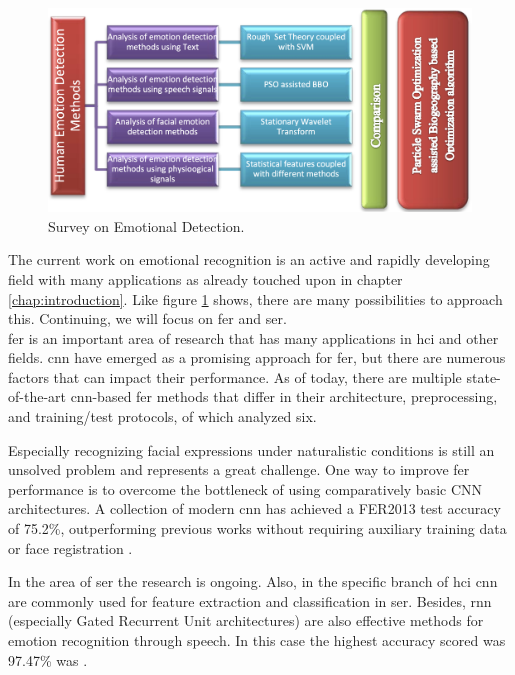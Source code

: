 \begin{figure}[h]
\centering
\includegraphics[width=1\textwidth]{images/Emotion-detection-survey.png}
\caption{Survey on Emotional Detection. \cite{survey}}\label{fig:survey}
\end{figure}

\noindent The current work on emotional recognition is an active and rapidly developing field with many applications as already touched upon in chapter \ref{chap:introduction}. Like figure \ref{fig:survey} shows, there are many possibilities to approach this. Continuing, we will focus on \acrshort{fer} and \acrshort{ser}.\\

\noindent \acrshort{fer} is an important area of research that has many applications in \acrshort{hci} and other fields. \acrfull{cnn} have emerged as a promising approach for \acrshort{fer}, but there are numerous factors that can impact their performance. As of today, there are multiple state-of-the-art \acrshort{cnn}-based \acrshort{fer} methods that differ in their architecture, preprocessing, and training/test protocols, of which \cite{pramerdorfer2016facial} analyzed six.

\noindent Especially recognizing facial expressions under naturalistic conditions is still an unsolved problem and represents a great challenge. One way to improve \acrshort{fer} performance is to overcome the bottleneck of using comparatively basic CNN architectures. A collection of modern \acrshort{cnn} has achieved a FER2013 \cite{FER2013} test accuracy of 75.2\%, outperforming previous works without requiring auxiliary training data or face registration \cite{pramerdorfer2016facial}.

\noindent In the area of \acrshort{ser} the research is ongoing. Also, in the specific branch of \acrshort{hci} \acrshort{cnn} are commonly used for feature extraction and classification in \acrshort{ser}. Besides, \acrfull{rnn} (especially Gated Recurrent Unit architectures) are also effective methods for emotion recognition through speech. In this case the highest accuracy scored was 97.47\% was \cite{GRU}.


